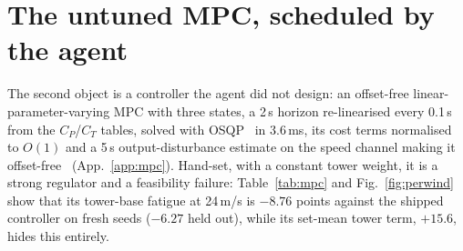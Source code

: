 \documentclass{article}
\begin{document}
\begin{table}[t]
\centering\small
\caption{Candidates and deliveries, per arm, on the shipped controller. Candidate level: of all candidates, those the plant could not run, those feasible on the set mean with a regulation gain, and those holding both loads at every wind speed on the design screen with a gain. Run level: runs reaching a feasible gain; runs whose per-wind selection meets the per-wind tolerance on both held-out sets under the rule the search used, under the same rule with one point of margin in the design-set screen, and under the rule completed with a set-mean tower margin of 6 points (App.~\ref{app:delivery}). The one Bayesian evaluation that did not complete is counted as a candidate and not as a plant failure.}
\label{tab:delivery}
\end{table}

\section{The untuned MPC, scheduled by the agent}
\label{sec:leg2}

The second object is a controller the agent did not design: an offset-free linear-parameter-varying MPC with three states, a 2\,s horizon re-linearised every 0.1\,s from the $C_P$/$C_T$ tables, solved with OSQP~\citep{Stellato2020osqp} in 3.6\,ms, its cost terms normalised to $O(1)$ and a 5\,s output-disturbance estimate on the speed channel making it offset-free~\citep{Liu2024offsetfree} (App.~\ref{app:mpc}). Hand-set, with a constant tower weight, it is a strong regulator and a feasibility failure: Table~\ref{tab:mpc} and Fig.~\ref{fig:perwind} show that its tower-base fatigue at 24\,m/s is $-8.76$ points against the shipped controller on fresh seeds ($-6.27$ held out), while its set-mean tower term, $+15.6$, hides this entirely.
\end{document}
